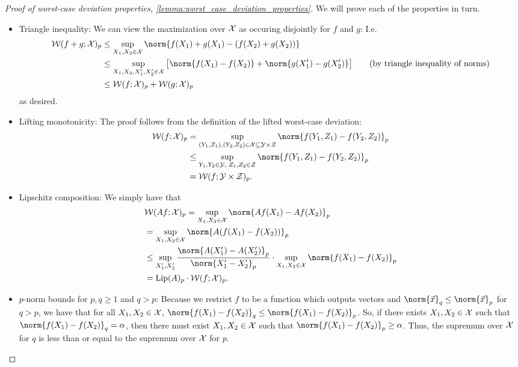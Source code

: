 \begin{proof}[Proof of worst-case deviation properties, \cref{lemma:worst_case_deviation_properties}]
	\label{proof:worst_case_deviation_properties}
	We will prove each of the properties in turn.
	\begin{itemize}
		\item Triangle inequality:
			We can view the maximization over $\mathcal{X}$ as occuring disjointly for $f$ and $g$:
			I.e. \begin{align*}
				\WD(f + g; \calX)_p 
			&\leq
            \sup_{X_1, X_2 \in \mathcal{X}} \norm{
			f(X_1) + g(X_1) - (f(X_2) + g(X_2))} \\
			&\leq \sup_{X_1, X_2, X_1', X_2' \in \mathcal{X}}  \big[\norm{f(X_1) - f(X_2)} 
            + \norm{g(X_1') - g(X_2')}\big] 
			\tag{by triangle inequality of norms}\\
			&\leq \WD(f ; \calX)_p + \WD(g ; \calX)_p
			\end{align*}
			as desired.
		\item Lifting monotonicity:
			The proof follows from the definition of the lifted worst-case deviation:
			\begin{align*}
				\WD(f ; \calX)_p &= \sup_{(Y_1, Z_1), (Y_2, Z_2) \in \calX \subseteq \calY \times \calZ} \norm{f(Y_1, Z_1) - f(Y_2, Z_2)}_p \\
						 &\leq \sup_{Y_1, Y_2 \in \calY, \; Z_1, Z_2 \in \calZ} \norm{f(Y_1, Z_1) - f(Y_2, Z_2)}_p \\
						 &= \WD(f ; \calY \times \calZ)_p.
			\end{align*}
		\item Lipschitz composition:
			We simply have that
			\begin{align*}
				&\WD(A f; \calX)_p = \sup_{X_1, X_2 \in \calX} \norm{A f(X_1) - A f(X_2)}_p \\
						  &= \sup_{X_1, X_2 \in \calX} \norm{A (f(X_1) - f(X_2))}_p \\
						  &\leq \sup_{X_1', X_2'} \frac{\norm{A(X_1') - A(X_2')}_p}{\norm{X_1' - X_2'}_p} \cdot \sup_{X_1, X_2 \in \calX} \norm{f(X_1) - f(X_2)}_p \\
						  &=\Lip(A)_p \cdot \WD(f; \calX)_p.
			\end{align*}
		\item $p$-norm bounds for $p, q \geq 1$ and $q > p$:
			Because we restrict $f$ to be a function which outputs vectors and $\norm{\vec{x}}_q \leq \norm{\vec{x}}_p$ for $q > p$, we have that for all $X_1, X_2 \in \mathcal{X}$, $\norm{f(X_1) - f(X_2)}_q \leq \norm{f(X_1) - f(X_2)}_p$.
			So, if there exists $X_1, X_2 \in \mathcal{X}$ such that $\norm{f(X_1) - f(X_2)}_q = \alpha$, then there must exist $X_1, X_2 \in \mathcal{X}$ such that $\norm{f(X_1) - f(X_2)}_p \geq \alpha$.
			Thus, the supremum over $\mathcal{X}$ for $q$ is less than or equal to the supremum over $\mathcal{X}$ for $p$.
		\end{itemize}
	\end{proof}

